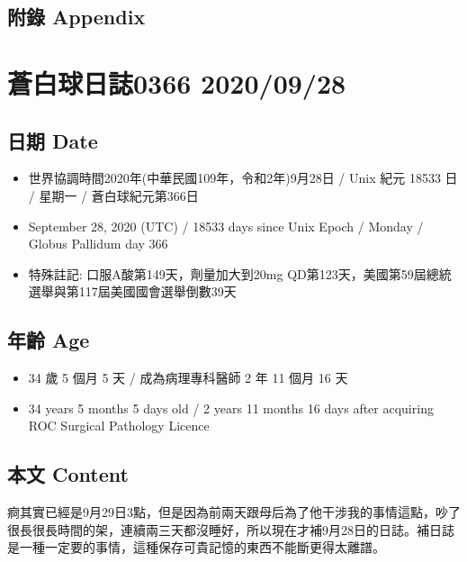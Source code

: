 \documentclass[a5paper, 11pt
]{book}
\providecommand{\tightlist}{%
  \setlength{\itemsep}{0pt}\setlength{\parskip}{0pt}}
\begin{document}
\hypertarget{ux9644ux9304-appendix-25}{%
\subsection{附錄 Appendix}\label{ux9644ux9304-appendix-25}}

\hypertarget{ux84bcux767dux7403ux65e5ux8a8c0366-20200928}{%
\section{蒼白球日誌0366
2020/09/28}\label{ux84bcux767dux7403ux65e5ux8a8c0366-20200928}}

\hypertarget{ux65e5ux671f-date-26}{%
\subsection{日期 Date}\label{ux65e5ux671f-date-26}}

\begin{itemize}
\tightlist
\item
  世界協調時間2020年(中華民國109年，令和2年)9月28日 / Unix 紀元 18533 日
  / 星期一 / 蒼白球紀元第366日
\item
  September 28, 2020 (UTC) / 18533 days since Unix Epoch / Monday /
  Globus Pallidum day 366
\item
  特殊註記: 口服A酸第149天，劑量加大到20mg
  QD第123天，美國第59屆總統選舉與第117屆美國國會選舉倒數39天
\end{itemize}

\hypertarget{ux5e74ux9f61-age-26}{%
\subsection{年齡 Age}\label{ux5e74ux9f61-age-26}}

\begin{itemize}
\tightlist
\item
  34 歲 5 個月 5 天 / 成為病理專科醫師 2 年 11 個月 16 天
\item
  34 years 5 months 5 days old / 2 years 11 months 16 days after
  acquiring ROC Surgical Pathology Licence
\end{itemize}

\hypertarget{ux672cux6587-content-26}{%
\subsection{本文 Content}\label{ux672cux6587-content-26}}

痾其實已經是9月29日3點，但是因為前兩天跟母后為了他干涉我的事情這點，吵了很長很長時間的架，連續兩三天都沒睡好，所以現在才補9月28日的日誌。補日誌是一種一定要的事情，這種保存可貴記憶的東西不能斷更得太離譜。
\end{document}
